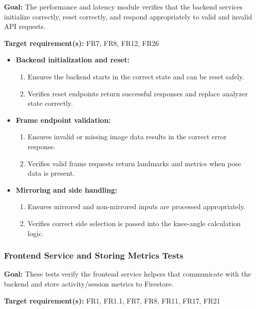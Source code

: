 \documentclass[12pt, titlepage]{article}
\begin{document}
\textbf{Goal:} The performance and latency module verifies that the backend services initialize correctly, reset correctly, and respond appropriately to valid and invalid API requests.

\textbf{Target requirement(s):} FR7, FR8, FR12, FR26

\begin{itemize}
    \item \textbf{Backend initialization and reset:}
    \begin{enumerate}
        \item Ensures the backend starts in the correct state and can be reset safely.
        \item Verifies reset endpoints return successful responses and replace analyzer state correctly.
    \end{enumerate}

    \item \textbf{Frame endpoint validation:}
    \begin{enumerate}
        \item Ensures invalid or missing image data results in the correct error response.
        \item Verifies valid frame requests return landmarks and metrics when pose data is present.
    \end{enumerate}

    \item \textbf{Mirroring and side handling:}
    \begin{enumerate}
        \item Ensures mirrored and non-mirrored inputs are processed appropriately.
        \item Verifies correct side selection is passed into the knee-angle calculation logic.
    \end{enumerate}
\end{itemize}

\subsubsection{Frontend Service and Storing Metrics Tests}

\textbf{Goal:} These tests verify the frontend service helpers that communicate with the backend and store activity/session metrics to Firestore.

\textbf{Target requirement(s):} FR1, FR1.1, FR7, FR8, FR11, FR17, FR21
\end{document}
